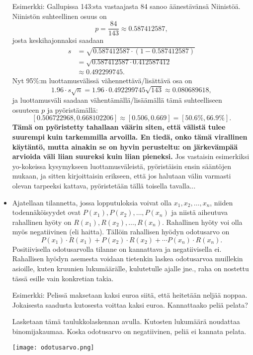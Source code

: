 \documentclass[12pt,leqno,a4paper,oneside]{amsart}
\theoremstyle{definition}
\theoremstyle{remark}
\numberwithin{equation}{section}
\begin{document}
\begin{itemize}
 Esimerkki: Gallupissa 143:sta vastaajasta 84 sanoo äänestävänsä Niinistöä. Niinistön suhteellinen osuus on 
 $$p=\frac{84}{143} \approx 0.587412587,$$
 josta keskihajonnaksi saadaan
 \begin{align*}
 s&=\sqrt{0.587412587\cdot (1-0.587412587)} \\&= \sqrt{0.587412587\cdot 0.412587412} \\&\approx 0.492299745 . 
 \end{align*}
 Nyt 95\%:m luottamusvälissä vähennettävä/lisättävä osa on
 $$1.96\cdot{s}{\sqrt{n}}=1.96\cdot{0.492299745}{\sqrt{143}} \approx 0.080689618,$$
 ja luottamusväli saadaan vähentämällä/lisäämällä tämä suhteelliseen osuuteen $p$ ja pyöristämällä:
 $$[0.506722968, 0.668102206] \approx [0.506, 0.669] = [50.6\%, 66.9\%].$$
 \textbf{Tämä on pyöristetty tahallaan väärin siten, että välistä tulee suurempi kuin tarkemmilla arvoilla. En tiedä, onko tämä virallinen 
 käytäntö, mutta ainakin se on hyvin perusteltu: on järkevämpää arvioida väli liian suureksi kuin liian pieneksi.} Jos vastaisin esimerkiksi
 yo-kokeissa kysymykseen luottamusväleistä, pyöristäisin ensin sääntöjen mukaan, ja sitten kirjoittaisin erikseen, että jos halutaan välin
 varmasti olevan tarpeeksi kattava, pyöristetään tällä toisella tavalla...

 \item
 Ajatellaan tilannetta, jossa lopputuloksia voivat olla $x_1, x_2, \ldots ,x_n$, niiden todennäköisyydet
 ovat $P(x_1 ) ,P(x_2 ) ,\ldots ,P(x_n )$ ja niistä aiheutuva rahallinen hyöty on $R(x_1 ), R(x_2 ) ,\ldots ,R(x_n )$.
 Rahallinen hyöty voi olla myös negatiivinen (eli haitta). Tällöin rahallisen hyödyn odotusarvo on
 $$P(x_1)\cdot R(x_1 ) +P(x_2)\cdot R(x_2 ) +\cdots P(x_n)\cdot R(x_n ) .$$
 Positiivisella odotusarvolla tilanne on kannattava ja negatiivisella ei. Rahallisen hyödyn asemesta voidaan tietenkin laskea odotusarvoa
 muillekin asioille, kuten kruunien lukumäärälle, kulutetulle ajalle jne., raha on nostettu tässä esille vain konkretian takia.
 
 Esimerkki: Pelissä maksetaan kaksi euroa siitä, että heitetään neljää noppaa. Jokaisesta saadusta kutosesta voittaa kaksi euroa. Kannattaako 
 peliä pelata?
 
 Lasketaan tämä taulukkolaskennan avulla. Kutosten lukumäärä noudattaa binomijakaumaa. Koska odotusarvo on negatiivinen, peliä ei kannata pelata.
 
 \texttt{[image: odotusarvo.png]}
 \end{itemize}
\end{document}
